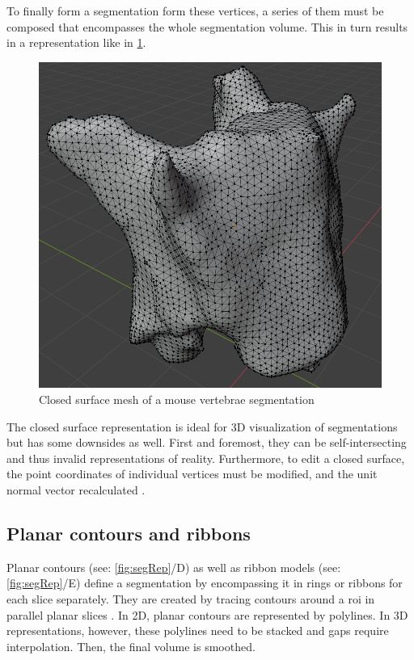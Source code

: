 \noindent
To finally form a segmentation form these vertices, a series of them must be composed that encompasses the whole segmentation volume.
This in turn results in a representation like in \cref{fig:spineMesh}.
\begin{figure}[h]
	\centerline{
		\includegraphics[scale=0.355]{images/spineMesh.png}}
	\caption{Closed surface mesh of a mouse vertebrae segmentation}\label{fig:spineMesh}
\end{figure}

\noindent
The closed surface representation is ideal for 3D visualization of segmentations but has some downsides as well.
First and foremost, they can be self-intersecting and thus invalid representations of reality.
Furthermore, to edit a closed surface, the point coordinates of individual vertices must be modified,
and the unit normal vector recalculated \cite{pinterPolymorphSegmentationRepresentation2019}.


\subsection{Planar contours and ribbons}\label{s:b-planar-contours}
Planar contours (see: \cref{fig:segRep}/D) as well as ribbon models (see: \cref{fig:segRep}/E) define a segmentation by encompassing it in rings or ribbons for each slice separately.
They are created by tracing contours around a \acrfull{roi} in parallel planar slices \cite{pinterPolymorphSegmentationRepresentation2019,weinsteinScanlineSurfacingBuilding2000}.
In 2D, planar contours are represented by polylines.
In 3D representations, however, these polylines need to be stacked and gaps require interpolation.
Then, the final volume is smoothed.

